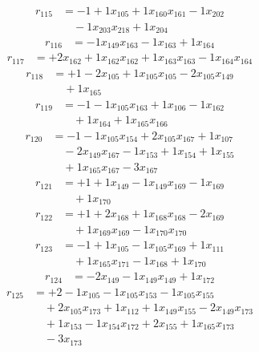 \[\begin{aligned}
r_{115} &= - 1 + 1 x_{105} + 1 x_{160} x_{161} - 1 x_{202} \\
 &\quad - 1 x_{203} x_{218} + 1 x_{204}
\end{aligned}\]
\[\begin{aligned}
r_{116} &= - 1 x_{149} x_{163} - 1 x_{163} + 1 x_{164}
\end{aligned}\]
\[\begin{aligned}
r_{117} &= + 2 x_{162} + 1 x_{162} x_{162} + 1 x_{163} x_{163} - 1 x_{164} x_{164}
\end{aligned}\]
\[\begin{aligned}
r_{118} &= + 1 - 2 x_{105} + 1 x_{105} x_{105} - 2 x_{105} x_{149} \\
 &\quad + 1 x_{165}
\end{aligned}\]
\[\begin{aligned}
r_{119} &= - 1 - 1 x_{105} x_{163} + 1 x_{106} - 1 x_{162} \\
 &\quad + 1 x_{164} + 1 x_{165} x_{166}
\end{aligned}\]
\[\begin{aligned}
r_{120} &= - 1 - 1 x_{105} x_{154} + 2 x_{105} x_{167} + 1 x_{107} \\
 &\quad - 2 x_{149} x_{167} - 1 x_{153} + 1 x_{154} + 1 x_{155} \\
 &\quad + 1 x_{165} x_{167} - 3 x_{167}
\end{aligned}\]
\[\begin{aligned}
r_{121} &= + 1 + 1 x_{149} - 1 x_{149} x_{169} - 1 x_{169} \\
 &\quad + 1 x_{170}
\end{aligned}\]
\[\begin{aligned}
r_{122} &= + 1 + 2 x_{168} + 1 x_{168} x_{168} - 2 x_{169} \\
 &\quad + 1 x_{169} x_{169} - 1 x_{170} x_{170}
\end{aligned}\]
\[\begin{aligned}
r_{123} &= - 1 + 1 x_{105} - 1 x_{105} x_{169} + 1 x_{111} \\
 &\quad + 1 x_{165} x_{171} - 1 x_{168} + 1 x_{170}
\end{aligned}\]
\[\begin{aligned}
r_{124} &= - 2 x_{149} - 1 x_{149} x_{149} + 1 x_{172}
\end{aligned}\]
\[\begin{aligned}
r_{125} &= + 2 - 1 x_{105} - 1 x_{105} x_{153} - 1 x_{105} x_{155} \\
 &\quad + 2 x_{105} x_{173} + 1 x_{112} + 1 x_{149} x_{155} - 2 x_{149} x_{173} \\
 &\quad + 1 x_{153} - 1 x_{154} x_{172} + 2 x_{155} + 1 x_{165} x_{173} \\
 &\quad - 3 x_{173}
\end{aligned}\]
